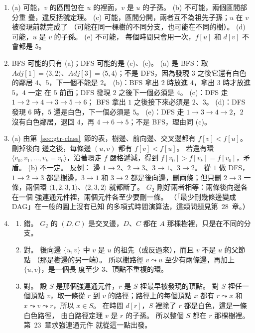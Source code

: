 \begin{enumerate}
依被看到的順序分類：$(1, 2)$ 樹邊，$(2, 3)$ 樹邊，$(3, 1)$ 後向邊，$(2, 5)$ 樹邊，
$(5, 4)$ 樹邊，$(4, 3)$ 交叉邊（$3$ 是黑色，$d[4] = 6 > d[3] = 3$），$(5, 6)$ 樹邊，
$(6, 7)$ 樹邊，$(7, 5)$ 後向邊，$(7, 6)$ 後向邊，$(1, 4)$ 前向邊（$4$ 是黑色，$d[1] = 1 <
d[4] = 6$）。 共 $6$ 條樹邊、$3$ 條後向邊、$1$ 條前向邊、$1$ 條交叉邊。 有後向邊，所以
有環，例如 $\langle 1, 2, 3, 1 \rangle$、$\langle 5, 6, 7, 5 \rangle$、$\langle 6, 7, 6
\rangle$。 只有一棵樹，所以樹邊是 $n - 1 = 6$ 條。

\item (a) 可能，$v$ 的區間包在 $u$ 的裡面，$v$ 是 $u$ 的子孫。 (b) 不可能，兩個區間部分重
疊，違反括號定理。 (c) 可能，區間分開，兩者互不為祖先子孫；$u$ 在 $v$ 被發現前就完成了
（可能在同一棵樹的不同分支，也可能在不同的樹）。 (d) 可能，$u$ 是 $v$ 的子孫。 (e) 不可能，
每個時間只會用一次，$f[u]$ 和 $d[v]$ 不會都是 $5$。

\item BFS 可能的只有 (a)；DFS 可能的是 (c)、(e)。 (a) 是 BFS：取 $\mathit{Adj}[1] = \langle 3, 2
\rangle$、$\mathit{Adj}[3] = \langle 5, 4 \rangle$；不是 DFS，因為發現 $3$ 之後它還有白色的鄰居
$4$、$5$，下一個不能是 $2$。 (b)：BFS 拿出 $2$ 時放進 $4$，拿出 $3$ 時才放進 $5$，$4$ 一定
在 $5$ 前面；DFS 發現 $2$ 之後下一個必須是 $4$。 (c)：DFS 走 $1 \to 2 \to 4 \to 3 \to 5 \to 6$；
BFS 拿出 $1$ 之後接下來必須是 $2$、$3$。 (d)：DFS 發現 $6$ 時，$5$ 還是白色，下一個必須是
$5$。 (e)：DFS 走 $1 \to 3 \to 4 \to 2$，$2$ 沒有白色鄰居，退回 $4$，再 $4 \to 6 \to 5$；不是
BFS，理由同 (c)。

\item (a) 由第~\ref{sec:gtr-class}~節的表，樹邊、前向邊、交叉邊都有 $f[v] < f[u]$。 刪掉後向
邊之後，每條邊 $(u, v)$ 都有 $f[v] < f[u]$。 若還有環 $\langle v_0, v_1, \ldots, v_k = v_0
\rangle$，沿著環走 $f$ 嚴格遞減，得到 $f[v_0] > f[v_k] = f[v_0]$，矛盾。 (b) 不一定。 反例：
邊 $1 \to 2$、$2 \to 3$、$3 \to 1$、$3 \to 2$。 從 $1$ 做 DFS，$1 \to 2 \to 3$ 都是樹邊，$3 \to
1$ 和 $3 \to 2$ 都是後向邊，刪兩條；但只刪 $2 \to 3$ 一條，兩個環 $\langle 1, 2, 3, 1
\rangle$、$\langle 2, 3, 2 \rangle$ 就都斷了。 $G_2$ 剛好兩者相等：兩條後向邊各在一個
強連通元件裡，兩個元件各至少要刪一條。 （「最少刪幾條邊變成 DAG」在一般的圖上沒有已知
的多項式時間演算法，這類問題見第~28~章。）

\item
\begin{enumerate}
\item 錯。 $G_2$ 的 $(D, C)$ 是交叉邊，$D$、$C$ 都在 $A$ 那棵樹裡，只是在不同的分支。
\item 對。 後向邊 $\{u, v\}$ 中 $v$ 是 $u$ 的祖先（或反過來），而且 $v$ 不是 $u$ 的父節點
（那是樹邊的另一端）。 所以樹路徑 $v \leadsto u$ 至少有兩條邊，再加上 $\{u, v\}$，是一個長
度至少 $3$、頂點不重複的環。
\item 對。 設 $S$ 是那個強連通元件，$r$ 是 $S$ 裡最早被發現的頂點。 對 $S$ 裡任一個頂點
$v$，取一條從 $r$ 到 $v$ 的路徑；路徑上的每個頂點 $x$ 都有 $r \leadsto x$ 和 $x \leadsto v
\leadsto r$，所以 $x \in S$。 在時間 $d[r]$，$S$ 裡除了 $r$ 都是白色，這是一條白色路徑，
由白路徑定理 $v$ 是 $r$ 的子孫。 所以整個 $S$ 都在 $r$ 那棵樹裡。 第~23~章求強連通元件
就從這一點出發。
\end{enumerate}


\end{enumerate}
